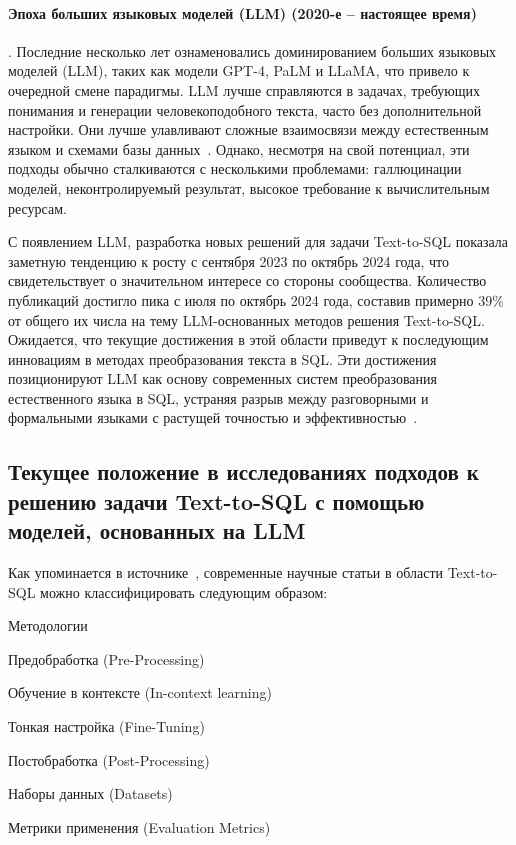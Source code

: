 \paragraph{Эпоха больших языковых моделей (LLM) (2020-е -- настоящее время)}. Последние несколько лет
ознаменовались доминированием больших языковых моделей (LLM), таких как модели GPT-4,
PaLM и LLaMA, что привело к очередной смене парадигмы. LLM лучше справляются в задачах, требующих понимания
и генерации человекоподобного текста, часто без дополнительной настройки. Они лучше улавливают
сложные взаимосвязи между естественным языком и схемами базы данных~\cite{zhuLargeLanguageModel2024,
	mohammadjafariNaturalLanguageSQL2025}. Однако, несмотря на свой потенциал, эти подходы обычно сталкиваются с несколькими проблемами:
галлюцинации моделей, неконтролируемый результат, высокое требование к вычислительным ресурсам.

С появлением LLM, разработка новых решений для задачи Text-to-SQL показала
заметную тенденцию к росту с сентября 2023 по октябрь 2024 года,
что свидетельствует о значительном интересе со стороны сообщества.
Количество публикаций достигло пика с июля по октябрь 2024 года,
составив примерно 39\% от общего их числа на тему
LLM-основанных методов решения Text-to-SQL.
Ожидается, что текущие достижения в этой области приведут к последующим инновациям
в методах преобразования текста в SQL. Эти достижения позиционируют LLM как
основу современных систем преобразования естественного языка в SQL,
устраняя разрыв между разговорными и формальными языками с растущей точностью и
эффективностью~\cite{huangExploringLandscapeTexttoSQL2025}.

\subsection{Текущее положение в исследованиях подходов к решению задачи Text-to-SQL
	с помощью моделей, основанных на LLM}

Как упоминается в источнике~\cite{huangExploringLandscapeTexttoSQL2025},
современные научные статьи в области Text-to-SQL можно классифицировать
следующим образом:
\begin{compactitem}
	\item Методологии
	\begin{compactitem}
		\item Предобработка (Pre-Processing)
		\item Обучение в контексте (In-context learning)
		\item Тонкая настройка (Fine-Tuning)
		\item Постобработка (Post-Processing)
	\end{compactitem}
	\item Наборы данных (Datasets)
	\item Метрики применения (Evaluation Metrics)
\end{compactitem}

